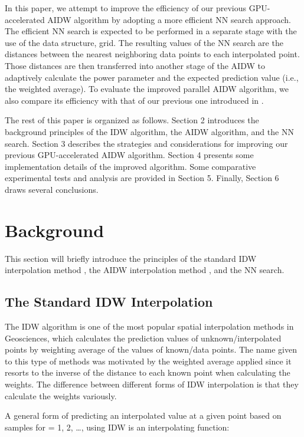 \documentclass[final,5p,times,twocolumn,authoryear]{elsarticle}
\begin{document}
In this paper, we attempt to improve the efficiency of our previous 
GPU-accelerated AIDW algorithm by adopting a more efficient NN search 
approach. The efficient NN search is expected to be performed in a separate 
stage with the use of the data structure, grid. The resulting values of the 
NN search are the distances between the  nearest neighboring data points to 
each interpolated point. Those distances are then transferred into another 
stage of the AIDW to adaptively calculate the power parameter and the 
expected prediction value (i.e., the weighted average). To evaluate the 
improved parallel AIDW algorithm, we also compare its efficiency with that 
of our previous one introduced in \cite{29DBLP:journals/corr/MeiXX15}.

The rest of this paper is organized as follows. Section 2 introduces the 
background principles of the IDW algorithm, the AIDW algorithm, and the 
NN search. Section 3 describes the strategies and considerations for 
improving our previous GPU-accelerated AIDW algorithm. Section 4 presents 
some implementation details of the improved algorithm. Some comparative 
experimental tests and analysis are provided in Section 5. Finally, Section 
6 draws several conclusions.

\section{Background}
This section will briefly introduce the principles of the standard IDW 
interpolation method \citep{01Shepard:1968:TIF:800186.810616}, the AIDW interpolation method 
\citep{28DBLP:journals/gandc/LuW08}, and the NN search.

\subsection{The Standard IDW Interpolation}
The IDW algorithm is one of the most popular spatial interpolation methods 
in Geosciences, which calculates the prediction values of 
unknown/interpolated points by weighting average of the values of known/data 
points. The name given to this type of methods was motivated by the weighted 
average applied since it resorts to the inverse of the distance to each 
known point when calculating the weights. The difference between different 
forms of IDW interpolation is that they calculate the weights variously. 

A general form of predicting an interpolated value  at a given point  based 
on samples  for  = 1, 2, {\ldots},  using IDW is an 
interpolating function: 
\end{document}
